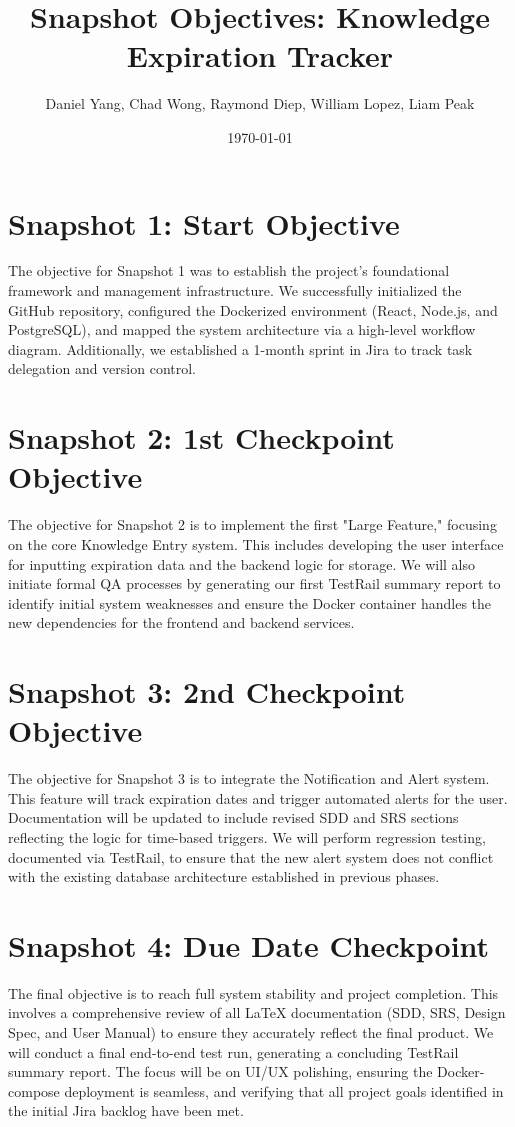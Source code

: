 \documentclass{article}
\title{Snapshot Objectives: Knowledge Expiration Tracker}
\author{Daniel Yang, Chad Wong, Raymond Diep, William Lopez, Liam Peak}
\date{\today}
\begin{document}
\maketitle

\section{Snapshot 1: Start Objective} 
The objective for Snapshot 1 was to establish the project's foundational framework and management infrastructure. We successfully initialized the GitHub repository, configured the Dockerized environment (React, Node.js, and PostgreSQL), and mapped the system architecture via a high-level workflow diagram. Additionally, we established a 1-month sprint in Jira to track task delegation and version control.

\section{Snapshot 2: 1st Checkpoint Objective}
The objective for Snapshot 2 is to implement the first "Large Feature," focusing on the core Knowledge Entry system. This includes developing the user interface for inputting expiration data and the backend logic for storage. We will also initiate formal QA processes by generating our first TestRail summary report to identify initial system weaknesses and ensure the Docker container handles the new dependencies for the frontend and backend services.

\section{Snapshot 3: 2nd Checkpoint Objective}
The objective for Snapshot 3 is to integrate the Notification and Alert system. This feature will track expiration dates and trigger automated alerts for the user. Documentation will be updated to include revised SDD and SRS sections reflecting the logic for time-based triggers. We will perform regression testing, documented via TestRail, to ensure that the new alert system does not conflict with the existing database architecture established in previous phases.

\section{Snapshot 4: Due Date Checkpoint}
The final objective is to reach full system stability and project completion. This involves a comprehensive review of all LaTeX documentation (SDD, SRS, Design Spec, and User Manual) to ensure they accurately reflect the final product. We will conduct a final end-to-end test run, generating a concluding TestRail summary report. The focus will be on UI/UX polishing, ensuring the Docker-compose deployment is seamless, and verifying that all project goals identified in the initial Jira backlog have been met.
\end{document}
